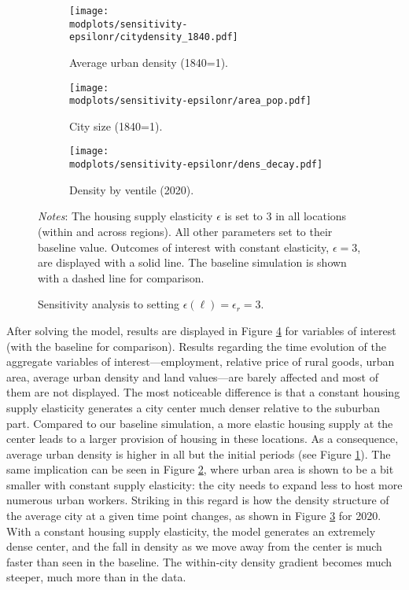 \documentclass[11pt]{report}
\newcommand{\round}{revision3}  %
\newcommand{\modplots}{../../output/model/plots/\round}
\newcommand{\pthree}{0.37}  %
\begin{document}
\begin{figure}[h!]
	\begin{adjustbox}{center}
		\begin{subfigure}{\pthree\textwidth}
			\texttt{[image: \\modplots/sensitivity-epsilonr/citydensity\_1840.pdf]}
			\caption{Average urban density (1840=1).\label{B-fig:model-sensi-epsilonr-avgd}}
		\end{subfigure}
		\begin{subfigure}{\pthree\textwidth}
			\texttt{[image: \\modplots/sensitivity-epsilonr/area\_pop.pdf]}
			\caption{City size (1840=1).\label{B-fig:model-sensi-epsilonr-pop}}
		\end{subfigure}
		\begin{subfigure}{\pthree\textwidth}
			\texttt{[image: \\modplots/sensitivity-epsilonr/dens\_decay.pdf]}
			\caption{Density by ventile (2020).\label{B-fig:model-sensi-epsilonr-dens}}
		\end{subfigure}
	\end{adjustbox}
	\caption{Sensitivity analysis to setting $\epsilon(\ell) = \epsilon_r = 3$.\label{B-fig:model-sensi-epsilonr}}
	{\footnotesize \textit{Notes}: The housing supply elasticity $\epsilon$ is set to $3$ in all locations (within and across regions). All other parameters set to their baseline value. Outcomes of interest with constant elasticity, $\epsilon=3$, are displayed with a solid line. The baseline simulation is shown with a dashed line for comparison.}
\end{figure}

After solving the model, results are displayed in Figure \ref{B-fig:model-sensi-epsilonr} for variables of interest (with the baseline for comparison).
Results regarding the time evolution of the aggregate variables of interest---employment, relative price of rural goods, urban area, average urban density and land values---are barely affected and most of them are not displayed. The most noticeable difference is that a constant housing supply elasticity generates a city center much denser relative to the suburban part. Compared to our baseline simulation, a more elastic housing supply at the center leads to a larger provision of housing in these locations. As a consequence, average urban density is higher in all but the initial periods (see Figure \ref{B-fig:model-sensi-epsilonr-avgd}). The same implication can be seen in Figure \ref{B-fig:model-sensi-epsilonr-pop}, where urban area is shown to be a bit smaller with constant supply elasticity: the city needs to expand less to host more numerous urban workers. Striking in this regard is how the density structure of the average city at a given time point changes, as shown in Figure \ref{B-fig:model-sensi-epsilonr-dens} for 2020. With a constant housing supply elasticity, the model generates an extremely dense center, and the fall in density as we move away from the center is much faster than seen in the baseline. The within-city density gradient becomes much steeper, much more than in the data.
\end{document}
